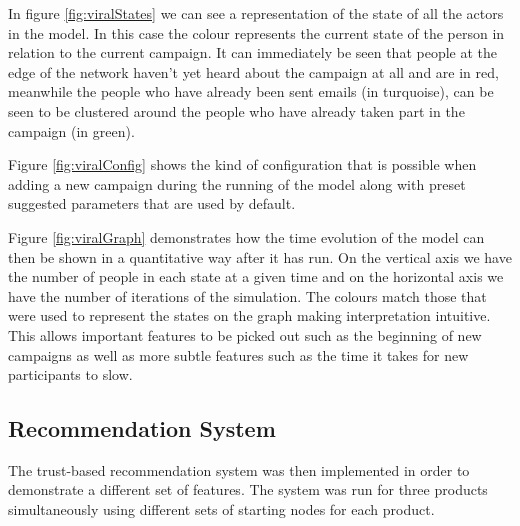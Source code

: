 \documentclass[12pt,a4paper]{article}
\begin{document}
In figure \ref{fig:viralStates} we can see a representation of the state of all the actors in the model. In this case the colour represents the current state of the person in relation to the current campaign. It can immediately be seen that people at the edge of the network haven't yet heard about the campaign at all and are in red, meanwhile the people who have already been sent emails (in turquoise), can be seen to be clustered around the people who have already taken part in the campaign (in green).

Figure \ref{fig:viralConfig} shows the kind of configuration that is possible when adding a new campaign during the running of the model along with preset suggested parameters that are used by default.

Figure \ref{fig:viralGraph} demonstrates how the time evolution of the model can then be shown in a quantitative way after it has run. On the vertical axis we have the number of people in each state at a given time and on the horizontal axis we have the number of iterations of the simulation. The colours match those that were used to represent the states on the graph making interpretation intuitive. This allows important features to be picked out such as the beginning of new campaigns as well as more subtle features such as the time it takes for new participants to slow.

\subsection{Recommendation System}
\noindent
The trust-based recommendation system was then implemented in order to demonstrate a different set of features. The system was run for three products simultaneously using different sets of starting nodes for each product.
\end{document}
